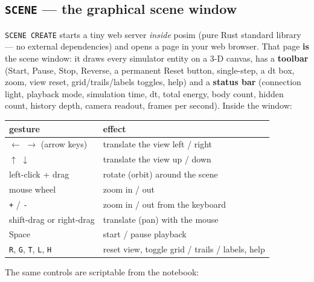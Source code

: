 \documentclass[11pt]{article}
\newcommand{\kw}[1]{\texttt{\uppercase{#1}}}
\newcommand{\code}[1]{\texttt{#1}}
\begin{document}
\subsection{\kw{scene} --- the graphical scene window}\label{sec:scene}

\kw{scene create} starts a tiny web server \emph{inside} posim (pure
Rust standard library --- no external dependencies) and opens a page in
your web browser. That page \textbf{is} the scene window: it draws
every simulator entity on a 3-D canvas, has a \textbf{toolbar} (Start,
Pause, Stop, Reverse, a permanent Reset button, single-step, a dt box,
zoom, view reset, grid/trails/labels toggles, help) and a
\textbf{status bar} (connection light, playback mode, simulation time,
dt, total energy, body count, hidden count, history depth, camera
readout, frames per second). Inside the window:

\begin{center}
\begin{tabular}{lp{8.4cm}}
\textbf{gesture} & \textbf{effect}\\\hline
$\leftarrow$ $\rightarrow$ (arrow keys) & translate the view left / right\\
$\uparrow$ $\downarrow$ & translate the view up / down\\
left-click + drag & rotate (orbit) around the scene\\
mouse wheel & zoom in / out\\
\code{+} / \code{-} & zoom in / out from the keyboard\\
shift-drag or right-drag & translate (pan) with the mouse\\
Space & start / pause playback\\
\code{R}, \code{G}, \code{T}, \code{L}, \code{H} & reset view, toggle grid / trails / labels, help\\
\end{tabular}
\end{center}

The same controls are scriptable from the notebook:
\end{document}
